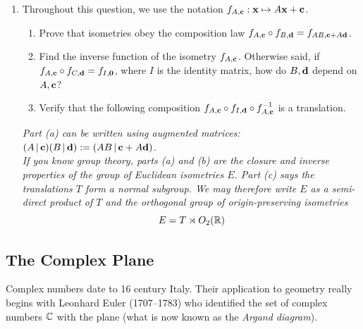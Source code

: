 \begin{exercises}
\begin{enumerate}
	  
	  \item\label{exs:kleingroup} Throughout this question, we use the notation $f_{A,{\mathbf{c}}}:{\mathbf{x}}\mapsto A{\mathbf{x}}+{\mathbf{c}}$.
	  \begin{enumerate}
	    \item Prove that isometries obey the composition law $f_{A,{\mathbf{c}}}\circ f_{B,{\mathbf{d}}}=f_{AB,{\mathbf{c}}+A{\mathbf{d}}}$.
	    \item Find the inverse function of the isometry $f_{A,{\mathbf{c}}}$. Otherwise said, if $f_{A,{\mathbf{c}}}\circ f_{C,{\mathbf{d}}}=f_{I,{\mathbf{0}}}$, where $I$ is the identity matrix, how do $B,{\mathbf{d}}$ depend on $A,{\mathbf{c}}$?
	    \item Verify that the following composition $f_{A,{\mathbf{c}}}\circ f_{I,{\mathbf{d}}}\circ f_{A,{\mathbf{c}}}^{-1}$ is a translation.
	  \end{enumerate}
		\emph{Part (a) can be written using augmented matrices: $(A\,|\,{\mathbf{c}})(B\,|\,{\mathbf{d}}):=(AB\,|\,{\mathbf{c}}+A{\mathbf{d}})$.\\
		If you know group theory, parts (a) and (b) are the closure and inverse properties of the group of Euclidean isometries $E$. Part (c) says the translations $T$ form a normal subgroup. We may therefore write $E$ as a semi-direct product of $T$ and the orthogonal group of origin-preserving isometries
		\[
			E=T\rtimes O_2(\mathbb{R})
		\]
		}
	
	\end{enumerate}
\end{exercises}

\clearpage



\subsection{The Complex Plane}\label{sec:complexplane}

Complex numbers date to 16\th{} century Italy. Their application to geometry really begins with Leonhard Euler (1707--1783) who identified the set of complex numbers $\mathbb{C}$ with the plane (what is now known as the \emph{Argand diagram}).

